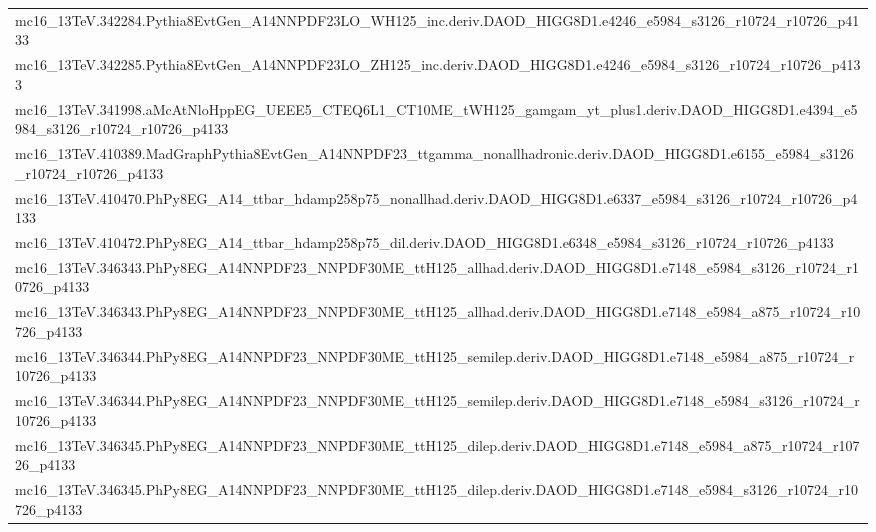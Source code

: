 \begin{adjustwidth}{-3em}{-3em}
\begin{longtable}{l}
mc16\_13TeV.342284.Pythia8EvtGen\_A14NNPDF23LO\_WH125\_inc.deriv.DAOD\_HIGG8D1.e4246\_e5984\_s3126\_r10724\_r10726\_p4133 \\
mc16\_13TeV.342285.Pythia8EvtGen\_A14NNPDF23LO\_ZH125\_inc.deriv.DAOD\_HIGG8D1.e4246\_e5984\_s3126\_r10724\_r10726\_p4133 \\
mc16\_13TeV.341998.aMcAtNloHppEG\_UEEE5\_CTEQ6L1\_CT10ME\_tWH125\_gamgam\_yt\_plus1.deriv.DAOD\_HIGG8D1.e4394\_e5984\_s3126\_r10724\_r10726\_p4133 \\
mc16\_13TeV.410389.MadGraphPythia8EvtGen\_A14NNPDF23\_ttgamma\_nonallhadronic.deriv.DAOD\_HIGG8D1.e6155\_e5984\_s3126\_r10724\_r10726\_p4133 \\
mc16\_13TeV.410470.PhPy8EG\_A14\_ttbar\_hdamp258p75\_nonallhad.deriv.DAOD\_HIGG8D1.e6337\_e5984\_s3126\_r10724\_r10726\_p4133 \\
mc16\_13TeV.410472.PhPy8EG\_A14\_ttbar\_hdamp258p75\_dil.deriv.DAOD\_HIGG8D1.e6348\_e5984\_s3126\_r10724\_r10726\_p4133 \\
mc16\_13TeV.346343.PhPy8EG\_A14NNPDF23\_NNPDF30ME\_ttH125\_allhad.deriv.DAOD\_HIGG8D1.e7148\_e5984\_s3126\_r10724\_r10726\_p4133 \\
mc16\_13TeV.346343.PhPy8EG\_A14NNPDF23\_NNPDF30ME\_ttH125\_allhad.deriv.DAOD\_HIGG8D1.e7148\_e5984\_a875\_r10724\_r10726\_p4133 \\
mc16\_13TeV.346344.PhPy8EG\_A14NNPDF23\_NNPDF30ME\_ttH125\_semilep.deriv.DAOD\_HIGG8D1.e7148\_e5984\_a875\_r10724\_r10726\_p4133 \\
mc16\_13TeV.346344.PhPy8EG\_A14NNPDF23\_NNPDF30ME\_ttH125\_semilep.deriv.DAOD\_HIGG8D1.e7148\_e5984\_s3126\_r10724\_r10726\_p4133 \\
mc16\_13TeV.346345.PhPy8EG\_A14NNPDF23\_NNPDF30ME\_ttH125\_dilep.deriv.DAOD\_HIGG8D1.e7148\_e5984\_a875\_r10724\_r10726\_p4133 \\
mc16\_13TeV.346345.PhPy8EG\_A14NNPDF23\_NNPDF30ME\_ttH125\_dilep.deriv.DAOD\_HIGG8D1.e7148\_e5984\_s3126\_r10724\_r10726\_p4133 \\

\end{longtable}                                                                                                              
\end{adjustwidth}
